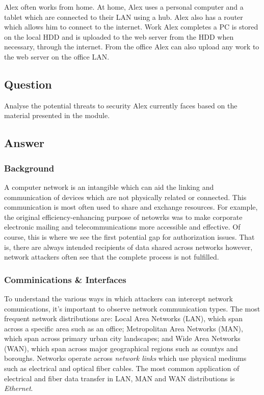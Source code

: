 \documentclass[11pt, english]{article}
\begin{document}
	Alex often works from home. At home, Alex uses a personal computer and a tablet which are connected to their LAN using a hub. Alex also has a router which allows him to connect to the internet. Work Alex completes a PC is stored on the local HDD and is uploaded to the web server from the HDD when necessary, through the internet. From the office Alex can also upload any work to the web server on the office LAN.

	\subsection{Question}

	Analyse the potential threats to security Alex currently faces based on the material presented in the module.

	\subsection{Answer}

		\subsubsection{Background}

	A computer network is an intangible which can aid the linking and communication of devices which are not physically related or connected. This communication is most often used to share and exchange resources. For example, the original efficiency-enhancing purpose of netowrks was to make corporate electronic mailing and telecommunications more accessible and effective. Of course, this is where we see the first potential gap for authorization issues. That is, there are always intended recipients of data shared across networks however, network attackers often see that the complete process is not fulfilled.

		\subsubsection{Comminications \& Interfaces}

	To understand the various ways in which attackers can intercept network comunications, it's important to observe network communication types. The most frequent network distributions are: Local Area Networks (LAN), which span across a specific area such as an office; Metropolitan Area Networks (MAN), which span across primary urban city landscapes; and Wide Area Networks (WAN), which span across major geographical regions such as countys and boroughs. Networks operate across \textit{network links} which use physical mediums such as electrical and optical fiber cables. The most common application of electrical and fiber data transfer in LAN, MAN and WAN distributions is \textit{Ethernet}.\\
\end{document}
